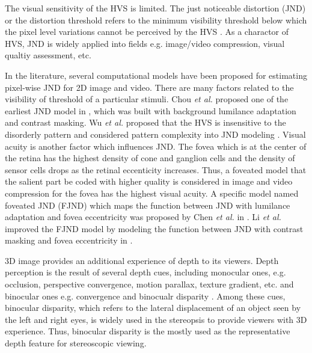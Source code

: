 \documentclass[journal]{IEEEtran}
\begin{document}
The visual sensitivity of the HVS is limited. The just noticeable distortion (JND) or the distortion threshold refers to the minimum visibility threshold below which the pixel level variations cannot be perceived by the HVS \cite{RN634}. As a charactor of HVS, JND is widely applied into fields e.g. image/video compression, visual qualtiy assessment, etc. 

In the literature, several computational models have been proposed for estimating pixel-wise JND for 2D image and video. There are many factors related to the visibility of threshold of a particular stimuli. Chou \textit{et al.} proposed one of the earliest JND model in \cite{RN634}, which was built with background lumilance adaptation and contrast masking. Wu \textit{et al.} proposed that the HVS is insensitive to the disorderly pattern and considered pattern complexity into JND modeling \cite{RN649, RN639, Wu2017Enhanced}. Visual acuity is another factor which influences JND. The fovea which is at the center of the retina has the highest density of cone and ganglion cells and the density of sensor cells drops as the retinal eccenticity increases. Thus, a foveated model that the salient part be coded with higher quality is considered in image and video compression \cite{RN652, RN650} for the fovea has the highest visual acuity. A specific model named foveated JND (FJND) which maps the function between JND with lumilance adaptation and fovea eccentricity was proposed by Chen \textit{et al.} in \cite{RN635}. Li \textit{et al.} improved the FJND model by modeling the function between JND with contrast masking and fovea eccentricity in \cite{RN633}.

3D image provides an additional experience of depth to its viewers. Depth perception is the result of several depth cues, including monocular ones, e.g. occlusion, perspective convergence, motion parallax, texture gradient, etc. and binocular ones e.g. convergence and binocualr disparity \cite{RN631}. Among these cues, binocular disparity, which refers to the lateral displacement of an object seen by the left and right eyes, is widely used in the stereopsis to provide viewers with 3D experience. Thus, binocular disparity is the mostly used as the representative depth feature for stereoscopic viewing. 
\end{document}
